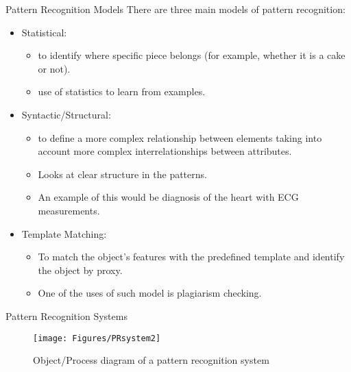 \begin{frame}{Pattern Recognition Models}
There are three main models of pattern recognition:
\setlength{\itemsep}{12pt}
\begin{itemize}
\item {\color{mycolor1}Statistical:} 
\begin{itemize}
\item to identify where specific piece belongs (for example, whether it is a cake or not).
\item use of statistics to learn from examples.
\end{itemize}


\item {\color{mycolor1}Syntactic/Structural:} 
\begin{itemize}
\item to define a more complex relationship between elements taking into account more complex interrelationships between attributes.
\item Looks at clear structure in the patterns.
\item An example of this would be diagnosis of the heart with ECG measurements.
\end{itemize}
\item {\color{mycolor1}Template Matching:}
\begin{itemize}
\item To match the object's features with the predefined template and identify the object by proxy. 
\item One of the uses of such model is plagiarism checking.
\end{itemize} 
\end{itemize}
\end{frame}

\begin{frame}{Pattern Recognition Systems}
\begin{figure}
\texttt{[image: Figures/PRsystem2]}
\caption{Object/Process diagram of a pattern recognition system}
\end{figure}
\end{frame}

